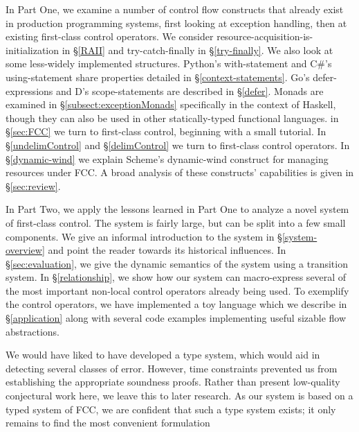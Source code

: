\documentclass[11pt]{article}
\begin{document}
In Part One, we examine a number of control flow constructs that already exist in production programming systems, first looking at exception handling, then at existing first-class control operators.
We consider resource-acquisition-is-initialization in \S\ref{RAII} and try-catch-finally in \S\ref{try-finally}.
We also look at some less-widely implemented structures.
Python's with-statement and C\#'s using-statement share properties detailed in \S\ref{context-statements}.
Go's defer-expressions and D's scope-statements are described in \S\ref{defer}.
Monads are examined in \S\ref{subsect:exceptionMonads} specifically in the context of Haskell, though they can also be used in other statically-typed functional languages.
in \S\ref{sec:FCC} we turn to first-class control, beginning with a small tutorial.
In \S\ref{undelimControl} and \S\ref{delimControl} we turn to first-class control operators.
In \S\ref{dynamic-wind} we explain Scheme's dynamic-wind construct for managing resources under FCC.
A broad analysis of these constructs' capabilities is given in \S\ref{sec:review}.

In Part Two, we apply the lessons learned in Part One to analyze a novel system of first-class control.
The system is fairly large, but can be split into a few small components.
We give an informal introduction to the system in \S\ref{system-overview} and point the reader towards its historical influences.
In \S\ref{sec:evaluation}, we give the dynamic semantics of the system using a transition system.
In \S\ref{relationship}, we show how our system can macro-express several of the most important non-local control operators already being used.
To exemplify the control operators, we have implemented a toy language which we describe in \S\ref{application} along with several code examples implementing useful sizable flow abstractions.

We would have liked to have developed a type system, which would aid in detecting several classes of error.
However, time constraints prevented us from establishing the appropriate soundness proofs.
Rather than present low-quality conjectural work here, we leave this to later research.
As our system is based on a typed system of FCC\cite{MFDC}, we are confident that such a type system exists; it only remains to find the most convenient formulation
\end{document}
